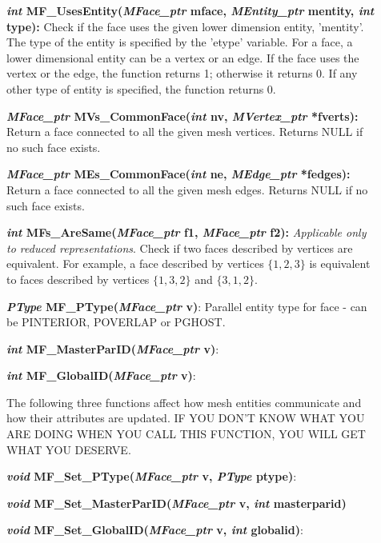\documentclass[12pt]{article}
\begin{document}
\begin{description}
\item[]

\item[]{\bf {\em int} MF\_UsesEntity({\em MFace\_ptr} mface,
{\em MEntity\_ptr} mentity, {\em int} type):} Check if the face
uses the given lower dimension entity, 'mentity'. The type of the
entity is specified by the 'etype' variable. For a face, a lower
dimensional entity can be a vertex or an edge. If the face uses the
vertex or the edge, the function returns 1; otherwise it returns 0. If
any other type of entity is specified, the function returns 0.

\item[]{\bf {\em MFace\_ptr} MVs\_CommonFace({\em int} nv,
    {\em MVertex\_ptr} *fverts):} Return a face connected to all
  the given mesh vertices. Returns NULL if no such face exists.

\item[]{\bf {\em MFace\_ptr} MEs\_CommonFace({\em int} ne,
    {\em MEdge\_ptr} *fedges):} Return a face connected to all
  the given mesh edges. Returns NULL if no such face exists.

\item[]{\bf {\em int} MFs\_AreSame({\em MFace\_ptr} f1, {\em
      MFace\_ptr} f2):} {\em Applicable only to reduced
    representations}. Check if two faces described by vertices are
  equivalent. For example, a face described by vertices $\{1,2,3\}$ is
  equivalent to faces described by vertices $\{1,3,2\}$ and
  $\{3,1,2\}$.

\item[]

\item[]  {\bf {\em PType} MF\_PType({\em MFace\_ptr} v)}: Parallel entity type for face - can be PINTERIOR, POVERLAP or PGHOST.
\item[]  {\bf {\em int}   MF\_MasterParID({\em MFace\_ptr} v)}:
\item[]  {\bf {\em int}   MF\_GlobalID({\em MFace\_ptr} v)}:

\item[]
\item[]  The following three functions affect how mesh entities communicate and how their attributes are updated. IF YOU DON'T KNOW WHAT YOU ARE DOING WHEN YOU CALL THIS FUNCTION, YOU WILL GET WHAT YOU DESERVE.
\item[]  {\bf {\em void}  MF\_Set\_PType({\em MFace\_ptr} v, {\em PType} ptype)}: 
\item[]  {\bf {\em void}  MF\_Set\_MasterParID({\em MFace\_ptr} v, {\em int} masterparid)}
\item[]  {\bf {\em void}  MF\_Set\_GlobalID({\em MFace\_ptr} v, {\em int} globalid)}:  


\end{description}
\end{document}
